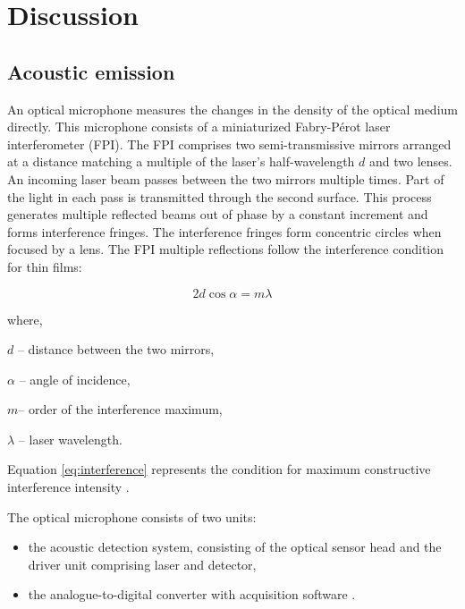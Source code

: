 \documentclass[sn-nature]{sn-jnl}%
\theoremstyle{thmstyleone}%
\theoremstyle{thmstyletwo}%
\theoremstyle{thmstylethree}%
\begin{document}
    



\section{Discussion}\label{sec:results}

    \subsection{Acoustic emission}

    An optical microphone measures the changes in the density of the optical medium directly. This microphone consists of a miniaturized Fabry-Pérot laser interferometer (FPI). The FPI comprises two semi-transmissive mirrors arranged at a distance matching a multiple of the laser’s half-wavelength $d$ and two lenses.
    An incoming laser beam passes between the two mirrors multiple times. Part of the light in each pass is transmitted through the second surface. This process generates multiple reflected beams out of phase by a constant increment and forms interference fringes. The interference fringes form concentric circles when focused by a lens. The FPI multiple reflections follow the interference condition for thin films:

    \begin{equation}
    2d\cos\alpha = m\lambda
    \label{eq:interference}
    \end{equation}

    where,

    \begin{unenumerate}
        \item $d$ -- distance between the two mirrors,
        \item $\alpha$ -- angle of incidence,
        \item $m$-- order of the interference maximum,
        \item $\lambda$ -- laser wavelength.
    \end{unenumerate}  

    Equation \ref{eq:interference} represents the condition for maximum constructive interference intensity \cite{fpi}.

     The optical microphone consists of two units:

    \begin{itemize}
        \item the acoustic detection system, consisting of the optical sensor head and the driver unit comprising laser and detector,
        \item the analogue-to-digital converter with acquisition software \cite{fischer_rohringer_panzer_hecker_2017}.
    \end{itemize}
\end{document}
